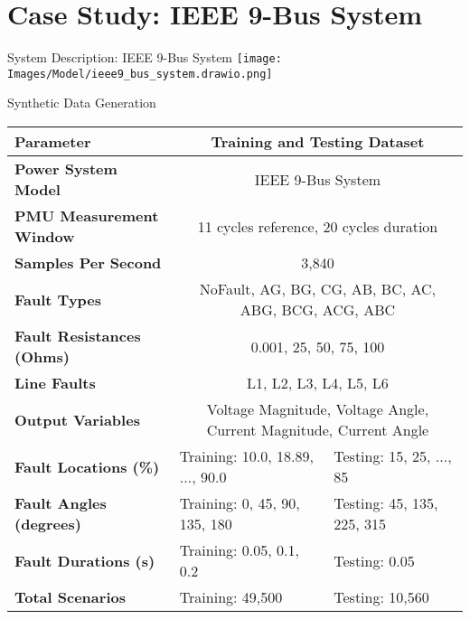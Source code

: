 \section{Case Study: IEEE 9-Bus System}
\begin{frame}{System Description: IEEE 9-Bus System}
  \centering
  \texttt{[image: Images/Model/ieee9\_bus\_system.drawio.png]} %
\end{frame}

\begin{frame}{Synthetic Data Generation}
\begin{tiny}
    \begin{table}
    \centering
    \begin{tabular}{|l|l|l|}
    \hline
    \textbf{Parameter}            & \multicolumn{2}{c|}{\textbf{Training and Testing Dataset}}     \\ \hline
    \textbf{Power System Model}   & \multicolumn{2}{c|}{IEEE 9-Bus System}                         \\ \hline
    \textbf{PMU Measurement Window} & \multicolumn{2}{c|}{11 cycles reference, 20 cycles duration}  \\ \hline
    \textbf{Samples Per Second}   & \multicolumn{2}{c|}{3,840}                                     \\ \hline
    \textbf{Fault Types}          & \multicolumn{2}{c|}{NoFault, AG, BG, CG, AB, BC, AC, ABG, BCG, ACG, ABC} \\ \hline
    \textbf{Fault Resistances (Ohms)} & \multicolumn{2}{c|}{0.001, 25, 50, 75, 100}                  \\ \hline
    \textbf{Line Faults}          & \multicolumn{2}{c|}{L1, L2, L3, L4, L5, L6}                    \\ \hline
    \textbf{Output Variables}     & \multicolumn{2}{c|}{Voltage Magnitude, Voltage Angle, Current Magnitude, Current Angle} \\ \hline
    \textbf{Fault Locations (\%)} & Training: 10.0, 18.89, ..., 90.0    & Testing: 15, 25, ..., 85               \\ \hline
    \textbf{Fault Angles (degrees)} & Training: 0, 45, 90, 135, 180       & Testing: 45, 135, 225, 315             \\ \hline
    \textbf{Fault Durations (s)}  & Training: 0.05, 0.1, 0.2             & Testing: 0.05                          \\ \hline
    \textbf{Total Scenarios}      & Training: 49,500                     & Testing: 10,560                        \\ \hline
    \end{tabular}
    \label{table:data_generation_parameters}
    \end{table}
\end{tiny}
\end{frame}

